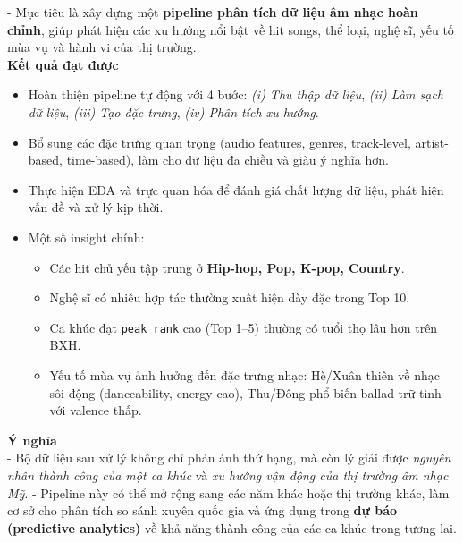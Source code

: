    - Mục tiêu là xây dựng một \textbf{pipeline phân tích dữ liệu âm nhạc hoàn chỉnh}, giúp phát hiện các xu hướng nổi bật về hit songs, thể loại, nghệ sĩ, yếu tố mùa vụ và hành vi của thị trường. \\
    
    \textbf{Kết quả đạt được} \\
    
    \begin{itemize}
        \item Hoàn thiện pipeline tự động với 4 bước: 
        \textit{(i) Thu thập dữ liệu}, \textit{(ii) Làm sạch dữ liệu}, 
        \textit{(iii) Tạo đặc trưng}, \textit{(iv) Phân tích xu hướng}.
        \item Bổ sung các đặc trưng quan trọng (audio features, genres, track-level, artist-based, time-based), 
        làm cho dữ liệu đa chiều và giàu ý nghĩa hơn.
        \item Thực hiện EDA và trực quan hóa để đánh giá chất lượng dữ liệu, phát hiện vấn đề và xử lý kịp thời.
        \item Một số insight chính: 
        \begin{itemize}
            \item Các hit chủ yếu tập trung ở \textbf{Hip-hop, Pop, K-pop, Country}.  
            \item Nghệ sĩ có nhiều hợp tác thường xuất hiện dày đặc trong Top 10.  
            \item Ca khúc đạt \texttt{peak rank} cao (Top 1–5) thường có tuổi thọ lâu hơn trên BXH.  
            \item Yếu tố mùa vụ ảnh hưởng đến đặc trưng nhạc: Hè/Xuân thiên về nhạc sôi động (danceability, energy cao), 
            Thu/Đông phổ biến ballad trữ tình với valence thấp.  
        \end{itemize}
    \end{itemize}
    
    \textbf{Ý nghĩa} \\
    
    - Bộ dữ liệu sau xử lý không chỉ phản ánh thứ hạng, mà còn lý giải được \textit{nguyên nhân thành công của một ca khúc} và \textit{xu hướng vận động của thị trường âm nhạc Mỹ}.  
    - Pipeline này có thể mở rộng sang các năm khác hoặc thị trường khác, 
    làm cơ sở cho phân tích so sánh xuyên quốc gia và ứng dụng trong \textbf{dự báo (predictive analytics)} về khả năng thành công của các ca khúc trong tương lai.  
